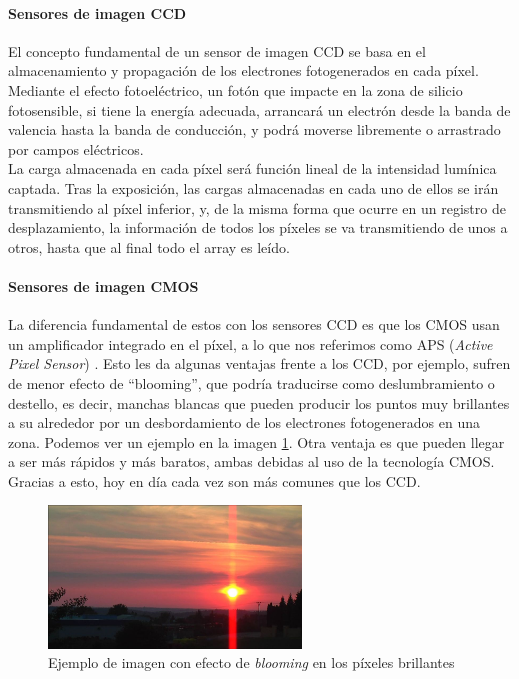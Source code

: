 \paragraph{Sensores de imagen CCD}
El concepto fundamental de un sensor de imagen CCD se basa en el almacenamiento
y propagación de los electrones fotogenerados en cada píxel. Mediante el efecto
fotoeléctrico, un fotón que impacte en la zona de silicio fotosensible, si tiene
la energía adecuada, arrancará un electrón desde la banda de valencia hasta la
banda de conducción, y podrá moverse libremente o arrastrado por campos eléctricos.\\

La carga almacenada en cada píxel será función lineal de la intensidad lumínica
captada. Tras la exposición, las cargas almacenadas en cada uno de ellos
se irán transmitiendo al píxel inferior, y, de la misma forma que ocurre en un
registro de desplazamiento, la información de todos los píxeles se va transmitiendo
de unos a otros, hasta que al final todo el array es leído.\cite{Nakamura2005}\\

\paragraph{Sensores de imagen CMOS}
La diferencia fundamental de estos con los sensores CCD es que los CMOS usan un
amplificador integrado en el píxel, a lo que nos referimos como APS (\textit{Active Pixel Sensor})
\cite{Fossum1993}. Esto les da algunas ventajas
frente a los CCD, por ejemplo, sufren de menor efecto de ``blooming'', que podría
traducirse como deslumbramiento o destello, es decir, manchas blancas que pueden
producir los puntos muy brillantes a su alrededor por un desbordamiento de los
electrones fotogenerados en una zona. Podemos ver un ejemplo en la
imagen \ref{fig:blooming}.
Otra ventaja es que pueden llegar a ser más rápidos y más baratos, ambas debidas
al uso de la tecnología CMOS. Gracias a esto, hoy en día cada vez son más comunes que los
CCD.\\

\begin{figure}[h]
	\centering
	\includegraphics[width=0.6\textwidth]{img/blooming.jpg}
	\caption{Ejemplo de imagen con efecto de \textit{blooming} en los píxeles brillantes
	\protect\footnotemark}
	\label{fig:blooming}
\end{figure}

